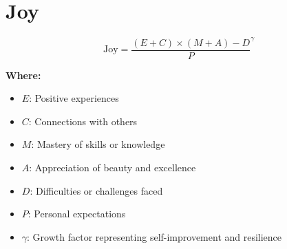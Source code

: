 \chapter{Joy}

\begin{equation}
\text{Joy} = \frac{(E + C) \times (M + A) - D}{P}^\gamma
\end{equation}

\textbf{Where:}

\begin{itemize}
    \item $E$: Positive experiences
    \item $C$: Connections with others
    \item $M$: Mastery of skills or knowledge
    \item $A$: Appreciation of beauty and excellence
    \item $D$: Difficulties or challenges faced
    \item $P$: Personal expectations
    \item $\gamma$: Growth factor representing self-improvement and resilience
\end{itemize}